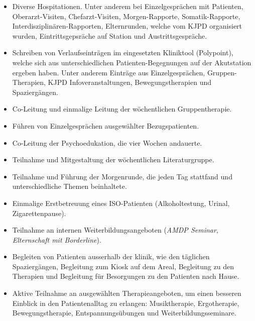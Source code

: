 \begin{itemize}
        \item Diverse Hospitationen. Unter anderem bei Einzelgesprächen mit Patienten, Oberarzt-Visiten, Chefarzt-Visiten, Morgen-Rapporte, Somatik-Rapporte, Interdisziplinären-Rapporten, Elternrunden, welche vom KJPD organisiert wurden, Eintrittsgepsräche auf Station und Austrittsgespräche.
        \item Schreiben von Verlaufseinträgen im eingesetzten Kliniktool (Polypoint), welche sich aus unterschiedlichen Patienten-Begegnungen auf der Akutstation ergeben haben. Unter anderem Einträge aus Einzelgesprächen, Gruppen-Therapien, KJPD Infoveranstaltungen, Bewegungstherapien und Spaziergängen.
        \item Co-Leitung und einmalige Leitung der wöchentlichen Gruppentherapie.
        \item Führen von Einzelgesprächen ausgewählter Bezugspatienten.
        \item Co-Leitung der Psychoedukation, die vier Wochen andauerte.
        \item Teilnahme und Mitgestaltung der wöchentlichen Literaturgruppe.
        \item Teilnahme und Führung der Morgenrunde, die jeden Tag stattfand und unterschiedliche Themen beinhaltete.
        \item Einmalige Erstbetreuung eines ISO-Patienten (Alkoholtestung, Urinal, Zigarettenpause).
        \item Teilnahme an internen Weiterbildungsangeboten (\textit{AMDP Seminar, Elternschaft mit Borderline}).
        \item Begleiten von Patienten ausserhalb der klinik, wie den täglichen Spaziergängen, Begleitung zum Kiosk auf dem Areal, Begleitung zu den Therapien und Begleitung für Besorgungen zu den Patienten nach Hause.
        \item Aktive Teilnahme an ausgewählten Therapieangeboten, um einen besseren Einblick in den Patientenalltag zu erlangen: Musiktherapie, Ergotherapie, Bewegungstherapie, Entspannungsübungen und Weiterbildungsseminare.
    \end{itemize}